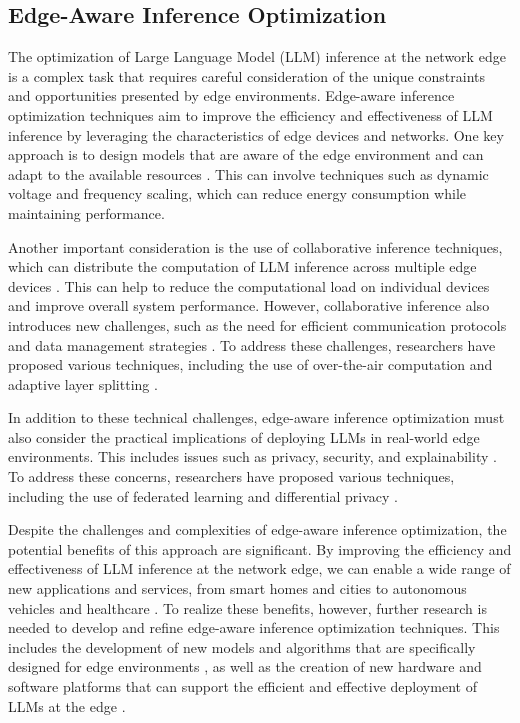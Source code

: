 \documentclass[11pt,a4paper]{article}
\begin{document}
\subsection{Edge-Aware Inference Optimization}


The optimization of Large Language Model (LLM) inference at the network edge is a complex task that requires careful consideration of the unique constraints and opportunities presented by edge environments. Edge-aware inference optimization techniques aim to improve the efficiency and effectiveness of LLM inference by leveraging the characteristics of edge devices and networks. One key approach is to design models that are aware of the edge environment and can adapt to the available resources \cite{doi:10.1145/3466752.3480095}. This can involve techniques such as dynamic voltage and frequency scaling, which can reduce energy consumption while maintaining performance.

Another important consideration is the use of collaborative inference techniques, which can distribute the computation of LLM inference across multiple edge devices \cite{doi:10.1109/comsnets53615.2022.9668515}. This can help to reduce the computational load on individual devices and improve overall system performance. However, collaborative inference also introduces new challenges, such as the need for efficient communication protocols and data management strategies \cite{doi:10.1109/jstsp.2025.3581478}. To address these challenges, researchers have proposed various techniques, including the use of over-the-air computation \cite{doi:10.1109/jstsp.2025.3581478} and adaptive layer splitting \cite{arxiv:2406.02616}.

In addition to these technical challenges, edge-aware inference optimization must also consider the practical implications of deploying LLMs in real-world edge environments. This includes issues such as privacy, security, and explainability \cite{arxiv:2502.11349}. To address these concerns, researchers have proposed various techniques, including the use of federated learning \cite{doi:10.1145/3690624.3709335} and differential privacy \cite{doi:10.56127/ijst.v3i3.1958}.

Despite the challenges and complexities of edge-aware inference optimization, the potential benefits of this approach are significant. By improving the efficiency and effectiveness of LLM inference at the network edge, we can enable a wide range of new applications and services, from smart homes and cities to autonomous vehicles and healthcare \cite{doi:10.1109/comst.2025.3527641}. To realize these benefits, however, further research is needed to develop and refine edge-aware inference optimization techniques. This includes the development of new models and algorithms that are specifically designed for edge environments \cite{arxiv:2412.15304}, as well as the creation of new hardware and software platforms that can support the efficient and effective deployment of LLMs at the edge \cite{doi:10.1145/3701997}.
\end{document}
